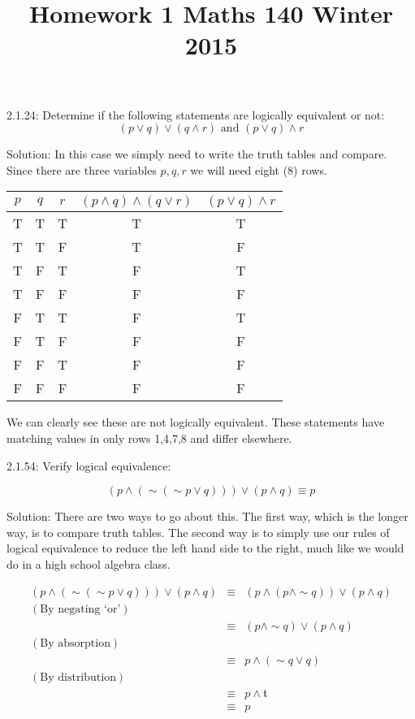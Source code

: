 \documentclass[16 pt]{amsart}
\theoremstyle{definition}
\theoremstyle{remark}
\numberwithin{equation}{subsection}
\begin{document}
\title{Homework 1 Maths 140 Winter 2015}
\maketitle 



2.1.24:
Determine if the following statements are logically equivalent or not:
\[
(p\vee q) \vee (q \wedge r)  \text{ and } (p \vee q) \wedge r
\]

\vspace{1in}

Solution: In this case we simply need to write the truth tables and compare.  Since there are three variables $p,q,r$ we will need eight (8) rows.

\begin{center}
  \begin{tabular}{ c | c | c | c | c}
    
    $p$ & $q$ & $r$ & $(p \wedge q) \wedge (q\vee r)$ & $(p\vee q)\wedge r$\\ \hline
    T & T & T & T & T\\ 
    T & T & F & T & F\\
    T & F & T & F & T\\
    T & F & F & F & F\\
    F & T & T & F & T\\
    F & T & F & F & F\\
    F & F & T & F & F\\
    F & F & F & F & F\\
  \end{tabular}
\end{center}


We can clearly see these are not logically equivalent.  These statements have matching values in only rows 1,4,7,8 and differ elsewhere.


\newpage

2.1.54: Verify logical equivalence:

\[
(p \wedge (\sim (\sim p \vee q))) \vee ( p \wedge q) \equiv p
\]

\vspace{1in}

Solution: There are two ways to go about this.  The first way, which is the longer way, is to compare truth tables.  The second way is to simply use our rules of logical equivalence to reduce the left hand side to the right, much like we would do in a high school algebra class.

\begin{eqnarray*}
(p \wedge (\sim (\sim p \vee q))) \vee ( p \wedge q) & \equiv & 
(p \wedge (p\wedge \sim q )) \vee (p\wedge q)\\
(\text{By negating `or'}) & & \\
& \equiv & (p\wedge \sim q) \vee (p\wedge q)\\
(\text{By absorption}) &&\\
& \equiv & p\wedge (\sim q \vee q)\\
(\text{By distribution}) &&\\
& \equiv & p \wedge \mathfrak{t} \\
& \equiv & p
\end{eqnarray*}
\end{document}
